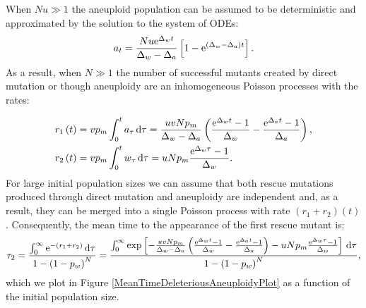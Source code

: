 \documentclass[12pt]{extarticle}
\renewcommand{\d}{{\rm d}}
\newcommand{\e}{{\rm e}}
\begin{document}
When $Nu\gg1$ the aneuploid population can be assumed to be deterministic and approximated by the solution to the system of ODEs:
\begin{equation}
a_t=\frac{Nu\e^{\Delta_wt}}{\Delta_w-\Delta_a}\left[1-\e^{\left(\Delta_w-\Delta_a\right)t}\right].
\end{equation}
As a result, when $N\gg1$ the number of successful mutants created by direct mutation or though aneuploidy are an inhomogeneous Poisson processes with the rates:




%

\begin{align*}
r_1\left(t\right)&=vp_m\int_0^ta_{\tau}\,\d\tau=\frac{uvNp_m}{\Delta_w-\Delta_a}\left(\frac{\e^{\Delta_wt}-1}{\Delta_w}-\frac{\e^{\Delta_at}-1}{\Delta_a}\right),\\
r_2\left(t\right)&=vp_m\int_0^tw_{\tau}\,\d\tau=uNp_m\frac{\e^{\Delta_w\tau}-1}{\Delta_w}.
\end{align*}
For large initial population sizes we can assume that both rescue mutations produced through direct mutation and aneuploidy are independent and, as a result, they can be merged into a single Poisson process with rate $\left(r_1+r_2\right)\left(t\right)$. Consequently, the mean time to the appearance of the first rescue mutant is: 
\begin{align}
\tau_2=\frac{\int_0^\infty\e^{-\left(r_1+r_2\right)}\,\d\tau}{1-\left(1-p_w\right)^N}=\frac{\int_0^\infty\exp\left[-\frac{uvNp_m}{\Delta_w-\Delta_a}\left(\frac{\e^{\Delta_wt}-1}{\Delta_w}-\frac{\e^{\Delta_at}-1}{\Delta_a}\right)-uNp_m\frac{\e^{\Delta_w\tau}-1}{\Delta_w}\right]\,\d\tau}{1-\left(1-p_w\right)^N},
\end{align}
which we plot in Figure \ref{MeanTimeDeleteriousAneuploidyPlot} as a function of the initial population size.
\end{document}
